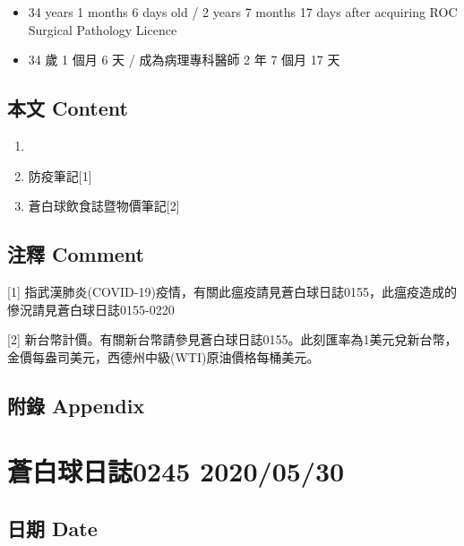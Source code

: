 \documentclass[
]{article}
\providecommand{\tightlist}{%
  \setlength{\itemsep}{0pt}\setlength{\parskip}{0pt}}
\begin{document}
\begin{itemize}
\tightlist
\item
  34 years 1 months 6 days old / 2 years 7 months 17 days after
  acquiring ROC Surgical Pathology Licence
\item
  34 歲 1 個月 6 天 / 成為病理專科醫師 2 年 7 個月 17 天
\end{itemize}

\hypertarget{ux672cux6587-content-28}{%
\subsection{本文 Content}\label{ux672cux6587-content-28}}

\begin{enumerate}
\def\labelenumi{\arabic{enumi}.}
\item
\item
  防疫筆記{[}1{]}
\item
  蒼白球飲食誌暨物價筆記{[}2{]}
\end{enumerate}

\hypertarget{ux6ce8ux91cb-comment-28}{%
\subsection{注釋 Comment}\label{ux6ce8ux91cb-comment-28}}

{[}1{]}
指武漢肺炎(COVID-19)疫情，有關此瘟疫請見蒼白球日誌0155，此瘟疫造成的慘況請見蒼白球日誌0155-0220

{[}2{]}
新台幣計價。有關新台幣請參見蒼白球日誌0155。此刻匯率為1美元兌新台幣，金價每盎司美元，西德州中級(WTI)原油價格每桶美元。

\hypertarget{ux9644ux9304-appendix-28}{%
\subsection{附錄 Appendix}\label{ux9644ux9304-appendix-28}}

\hypertarget{ux84bcux767dux7403ux65e5ux8a8c0245-20200530}{%
\section{蒼白球日誌0245
2020/05/30}\label{ux84bcux767dux7403ux65e5ux8a8c0245-20200530}}

\hypertarget{ux65e5ux671f-date-29}{%
\subsection{日期 Date}\label{ux65e5ux671f-date-29}}
\end{document}
